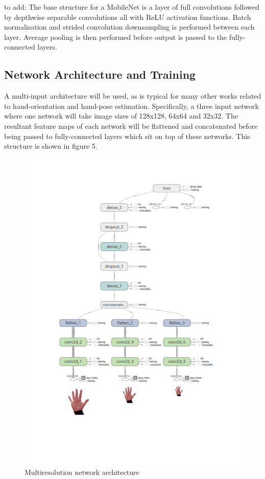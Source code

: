 \documentclass{article}
\begin{document}
to add: The base structure for a MobileNet is a layer of full convolutions followed by depthwise separable convolutions all with ReLU activation functions. Batch normalisation and strided convolution downsampling is performed between each layer. Average pooling is then performed before output is passed to the fully-connected layers.\\


\subsection{Network Architecture and Training}
A multi-input architecture will be used, as is typical for many other works related to hand-orientation and hand-pose estimation. Specifically, a three input network where one network will take image sizes of 128x128, 64x64 and 32x32. The resultant feature maps of each network will be flattened and concatenated before being passed to fully-connected layers which sit on top of these networks. This structure is shown in figure 5.\\

\begin{figure}[h]
  \centering
  \includegraphics[scale=0.4]{tbgraph.pdf}
  \vspace*{-15mm}
  \caption{Multiresolution network architecture}
  \label{fig:multiinput}
\end{figure}
\end{document}
